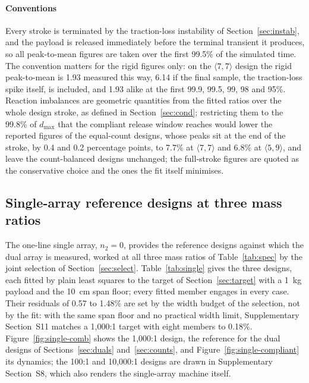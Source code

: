 \documentclass[preprint,12pt,number]{elsarticle}
\newcommand{\dmax}{d_{\max}}
\newcommand{\cfg}[2]{\langle #1,#2\rangle}
\newcommand{\ptm}{peak-to-mean}
\begin{document}
\paragraph{Conventions} Every stroke is terminated by the traction-loss instability of Section~\ref{sec:instab}, and the payload is released immediately before the terminal transient it produces, so all \ptm{} figures are taken over the first 99.5\% of the simulated time. The convention matters for the rigid figures only: on the $\cfg{7}{7}$ design the rigid \ptm{} is 1.93 measured this way, 6.14 if the final sample, the traction-loss spike itself, is included, and 1.93 alike at the first 99.9, 99.5, 99, 98 and 95\%. Reaction imbalances are geometric quantities from the fitted ratios over the whole design stroke, as defined in Section~\ref{sec:cond}; restricting them to the 99.8\% of $\dmax$ that the compliant release window reaches would lower the reported figures of the equal-count designs, whose peaks sit at the end of the stroke, by 0.4 and 0.2 percentage points, to 7.7\% at $\cfg{7}{7}$ and 6.8\% at $\cfg{5}{9}$, and leave the count-balanced designs unchanged; the full-stroke figures are quoted as the conservative choice and the ones the fit itself minimises.

\subsection{Single-array reference designs at three mass ratios}
\label{sec:singles}

The one-line single array, $n_2 = 0$, provides the reference designs against which the dual array is measured, worked at all three mass ratios of Table~\ref{tab:spec} by the joint selection of Section~\ref{sec:select}. Table~\ref{tab:single} gives the three designs, each fitted by plain least squares to the target of Section~\ref{sec:target} with a 1~kg payload and the 10~cm span floor; every fitted member engages in every case. Their residuals of 0.57 to 1.48\% are set by the width budget of the selection, not by the fit: with the same span floor and no practical width limit, Supplementary Section~S11 matches a 1,000:1 target with eight members to 0.18\%. Figure~\ref{fig:single-comb} shows the 1,000:1 design, the reference for the dual designs of Sections~\ref{sec:duals} and~\ref{sec:counts}, and Figure~\ref{fig:single-compliant} its dynamics; the 100:1 and 10,000:1 designs are drawn in Supplementary Section~S8, which also renders the single-array machine itself.
\end{document}
